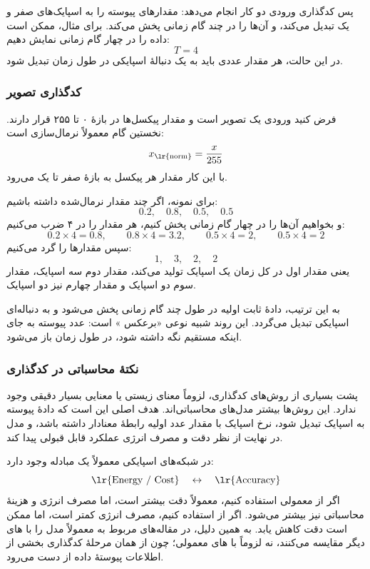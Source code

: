پس کدگذاری ورودی دو کار انجام می‌دهد: مقدارهای پیوسته را به اسپایک‌های صفر و یک تبدیل می‌کند، و آن‌ها را در چند گام زمانی پخش می‌کند. برای مثال، ممکن است داده را در چهار گام زمانی نمایش دهیم:
\[
T = 4
\]
در این حالت، هر مقدار عددی باید به یک دنبالهٔ اسپایکی در طول زمان تبدیل شود.

\subsubsection{کدگذاری تصویر}
فرض کنید ورودی یک تصویر است و مقدار پیکسل‌ها در بازهٔ ۰ تا ۲۵۵ قرار دارند. نخستین گام معمولاً نرمال‌سازی است:
\[
x_{\text{\lr{norm}}} = \frac{x}{255}
\]
با این کار مقدار هر پیکسل به بازهٔ صفر تا یک می‌رود.

برای نمونه، اگر چند مقدار نرمال‌شده داشته باشیم:
\[
0.2,\quad 0.8,\quad 0.5,\quad 0.5
\]
و بخواهیم آن‌ها را در چهار گام زمانی پخش کنیم، هر مقدار را در ۴ ضرب می‌کنیم:
\[
0.2 \times 4 = 0.8,\qquad
0.8 \times 4 = 3.2,\qquad
0.5 \times 4 = 2,\qquad
0.5 \times 4 = 2
\]
سپس مقدارها را گرد می‌کنیم:
\[
1,\quad 3,\quad 2,\quad 2
\]
یعنی مقدار اول در کل زمان یک اسپایک تولید می‌کند، مقدار دوم سه اسپایک، مقدار سوم دو اسپایک و مقدار چهارم نیز دو اسپایک.

به این ترتیب، دادهٔ ثابت اولیه در طول چند گام زمانی پخش می‌شود و به دنباله‌ای اسپایکی تبدیل می‌گردد. این روند شبیه نوعی «برعکس » است: عدد پیوسته به جای اینکه مستقیم نگه داشته شود، در طول زمان باز می‌شود.

\subsubsection{نکتهٔ محاسباتی در کدگذاری}
پشت بسیاری از روش‌های کدگذاری، لزوماً معنای زیستی یا معنایی بسیار دقیقی وجود ندارد. این روش‌ها بیشتر مدل‌های محاسباتی‌اند. هدف اصلی این است که دادهٔ پیوسته به اسپایک تبدیل شود، نرخ اسپایک با مقدار عدد اولیه رابطهٔ معنادار داشته باشد، و مدل در نهایت از نظر دقت و مصرف انرژی عملکرد قابل قبولی پیدا کند.

در شبکه‌های اسپایکی معمولاً یک مبادله وجود دارد:
\[
\text{\lr{Energy / Cost}} \quad \leftrightarrow \quad \text{\lr{Accuracy}}
\]
اگر از  معمولی استفاده کنیم، معمولاً دقت بیشتر است، اما مصرف انرژی و هزینهٔ محاسباتی نیز بیشتر می‌شود. اگر از  استفاده کنیم، مصرف انرژی کمتر است، اما ممکن است دقت کاهش یابد. به همین دلیل، در مقاله‌های مربوط به  معمولاً مدل را با های دیگر مقایسه می‌کنند، نه لزوماً با های معمولی؛ چون از همان مرحلهٔ کدگذاری بخشی از اطلاعات پیوستهٔ داده از دست می‌رود.


